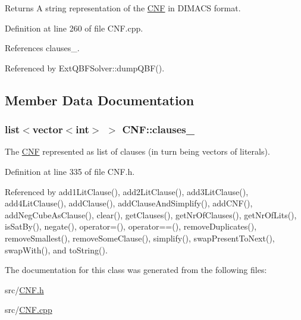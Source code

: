 \begin{DoxyReturn}{Returns}
A string representation of the \hyperlink{classCNF}{C\-N\-F} in D\-I\-M\-A\-C\-S format. 
\end{DoxyReturn}


Definition at line 260 of file C\-N\-F.\-cpp.



References clauses\-\_\-.



Referenced by Ext\-Q\-B\-F\-Solver\-::dump\-Q\-B\-F().



\subsection{Member Data Documentation}
\hypertarget{classCNF_acc8cc195dc20d00c47d6a2282b45a612}{
\subsubsection[{clauses\-\_\-}]{\setlength{\rightskip}{0pt plus 5cm}list$<$vector$<$int$>$ $>$ C\-N\-F\-::clauses\-\_\-\hspace{0.3cm}{\ttfamily [protected]}}}\label{classCNF_acc8cc195dc20d00c47d6a2282b45a612}


The \hyperlink{classCNF}{C\-N\-F} represented as list of clauses (in turn being vectors of literals). 



Definition at line 335 of file C\-N\-F.\-h.



Referenced by add1\-Lit\-Clause(), add2\-Lit\-Clause(), add3\-Lit\-Clause(), add4\-Lit\-Clause(), add\-Clause(), add\-Clause\-And\-Simplify(), add\-C\-N\-F(), add\-Neg\-Cube\-As\-Clause(), clear(), get\-Clauses(), get\-Nr\-Of\-Clauses(), get\-Nr\-Of\-Lits(), is\-Sat\-By(), negate(), operator=(), operator==(), remove\-Duplicates(), remove\-Smallest(), remove\-Some\-Clause(), simplify(), swap\-Present\-To\-Next(), swap\-With(), and to\-String().



The documentation for this class was generated from the following files\-:\begin{DoxyCompactItemize}
\item 
src/\hyperlink{CNF_8h}{C\-N\-F.\-h}\item 
src/\hyperlink{CNF_8cpp}{C\-N\-F.\-cpp}\end{DoxyCompactItemize}
